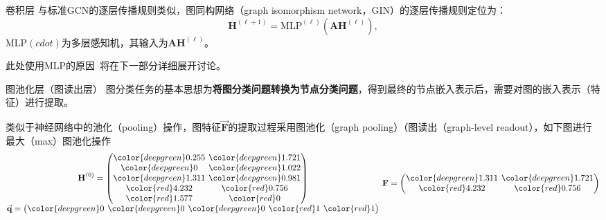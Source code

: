 \documentclass{beamer}
\begin{document}
\begin{frame}{卷积层}
	与标准GCN的逐层传播规则类似，图同构网络（graph isomorphism network，GIN）的逐层传播规则定位为：
	\begin{equation}
		\textbf{H}^{\left(\ell+1\right)}=\text{MLP}^{\left(\ell\right)}\left(\textbf{A}\textbf{H}^{\left(\ell\right)}\right),
	\end{equation}
	$\text{MLP}\left(cdot\right)$为多层感知机，其输入为$\textbf{A}\textbf{H}^{\left(\ell\right)}$。
	
	此处使用MLP的原因~\cite{xu2019gin}将在下一部分详细展开讨论。
\end{frame}

\begin{frame}{图池化层（图读出层）}
	图分类任务的基本思想为{\color{red}\textbf{将图分类问题转换为节点分类问题}}，得到最终的节点嵌入表示后，需要对图的嵌入表示（特征）进行提取。
	
	类似于神经网络中的池化（pooling）操作，图特征$\vec{\textbf{F}}$的提取过程采用图池化（graph pooling）（图读出（graph-level readout），如下图进行最大（max）图池化操作
	\begin{equation}
		\setlength{\arraycolsep}{2pt}
		\begin{matrix}
			\begin{matrix}
				\textbf{H}^{\left(0\right)}=\begin{pmatrix}
					{\color{deepgreen}0.255} & {\color{deepgreen}1.721}\\
					{\color{deepgreen}0} & {\color{deepgreen}1.022}\\
					{\color{deepgreen}1.311} & {\color{deepgreen}0.981}\\
					{\color{red}4.232} & {\color{red}0.756} \\
					{\color{red}1.577} & {\color{red}0} 
				\end{pmatrix} \\
				\vec{\textbf{q}}=\begin{pmatrix}
					{\color{deepgreen}0} & {\color{deepgreen}0} & {\color{deepgreen}0} & {\color{red}1} & {\color{red}1}
				\end{pmatrix}
			\end{matrix} &
			\textbf{F}=\begin{pmatrix}
				{\color{deepgreen}1.311} & {\color{deepgreen}1.721}\\
				{\color{red}4.232} & {\color{red}0.756}
			\end{pmatrix}
		\end{matrix}
	\end{equation}
\end{frame}
\end{document}
